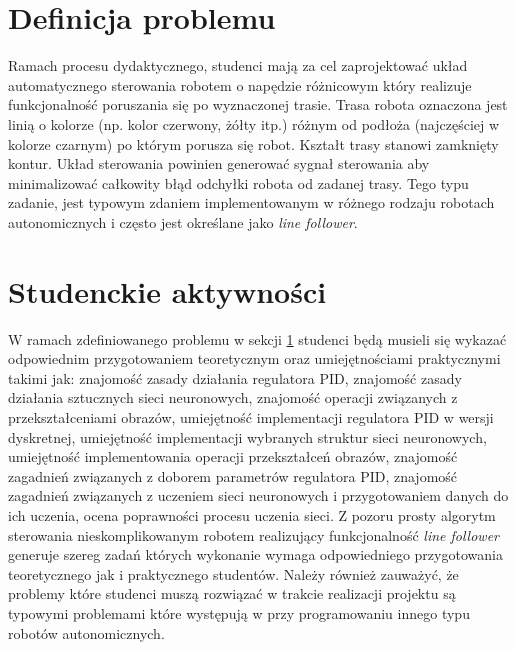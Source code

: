 \documentclass[conference]{IEEEtran}
\begin{document}

\section{Definicja problemu}\label{sec:problem-definition}
Ramach procesu dydaktycznego, studenci mają za cel zaprojektować układ automatycznego sterowania robotem o napędzie różnicowym który realizuje funkcjonalność poruszania się po wyznaczonej trasie. Trasa robota oznaczona jest linią o kolorze (np. kolor czerwony, żółty itp.) różnym od podłoża (najczęściej w kolorze czarnym) po którym porusza się robot. Kształt trasy stanowi zamknięty kontur. Układ sterowania powinien generować sygnał sterowania aby minimalizować całkowity błąd odchyłki robota od zadanej trasy.  Tego typu zadanie, jest typowym zdaniem implementowanym w różnego rodzaju robotach autonomicznych i często jest określane jako \emph{line follower}.  


\section{Studenckie aktywności}\label{sec:student-activity}
W ramach zdefiniowanego problemu w sekcji \ref{sec:problem-definition} studenci będą musieli się wykazać odpowiednim przygotowaniem teoretycznym oraz umiejętnościami praktycznymi takimi jak: 
znajomość zasady działania regulatora PID, znajomość zasady działania sztucznych sieci neuronowych, znajomość operacji związanych z przekształceniami obrazów, umiejętność implementacji regulatora PID w wersji dyskretnej, umiejętność implementacji wybranych struktur sieci neuronowych, umiejętność implementowania operacji przekształceń obrazów, znajomość zagadnień związanych z doborem parametrów regulatora PID, znajomość zagadnień związanych z uczeniem sieci neuronowych i przygotowaniem danych do ich uczenia, ocena poprawności procesu uczenia sieci. Z pozoru prosty algorytm sterowania nieskomplikowanym robotem realizujący funkcjonalność \emph{line follower} generuje szereg zadań których wykonanie wymaga odpowiedniego przygotowania teoretycznego jak i praktycznego studentów. Należy również zauważyć, że problemy które studenci muszą rozwiązać w trakcie realizacji projektu są typowymi problemami które występują w przy programowaniu innego typu robotów autonomicznych.

\end{document}
